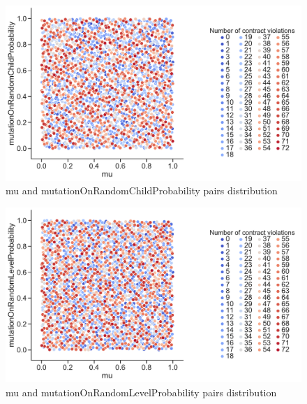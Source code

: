 \begin{figure}
	\centering
	\includegraphics[width=\textwidth]{images/PairsDistr/mu_mutationOnRandomChildProbability.pdf}
	\caption[mu and mutationOnRandomChildProbability pairs distribution]{mu and mutationOnRandomChildProbability pairs distribution}
	\label{fig:mu_mutationOnRandomChildProbability_pair}
\end{figure}
\begin{figure}
	\centering
	\includegraphics[width=\textwidth]{images/PairsDistr/mu_mutationOnRandomLevelProbability.pdf}
	\caption[mu and mutationOnRandomLevelProbability pairs distribution]{mu and mutationOnRandomLevelProbability pairs distribution}
	\label{fig:mu_mutationOnRandomLevelProbability_pair}
\end{figure}
